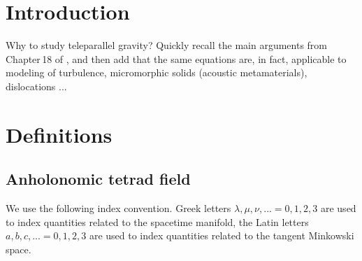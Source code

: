 \documentclass[
10pt, %
a4paper, %
oneside, %
headinclude,footinclude, %
BCOR5mm, %
]{scrartcl}
\begin{document}
\let\thefootnote\relax{}
\let\thefootnote\relax{}
\let\thefootnote\relax{}
\let\thefootnote\relax{}
\let\thefootnote\relax{}


\setlength\parindent{10pt} %
\setlength{\parskip}{5pt} %


\section{Introduction}

Why to study teleparallel gravity? Quickly recall the main arguments from Chapter\,18 of 
\cite{AldrovandiPereiraBook}, and then add that the same equations are, in fact, applicable to 
modeling of 
turbulence, micromorphic solids (acoustic metamaterials), dislocations \cite{PRD-Torsion2018}... 

\section{Definitions}

\subsection{Anholonomic tetrad field}

We use the following index convention. Greek letters $ \lambda,\mu,\nu,... =0,1,2,3
$ are used to index quantities related to the spacetime manifold, the Latin letters $ a,b,c,... 
=0,1,2,3$ are used to index quantities related to the tangent Minkowski space.
\end{document}

